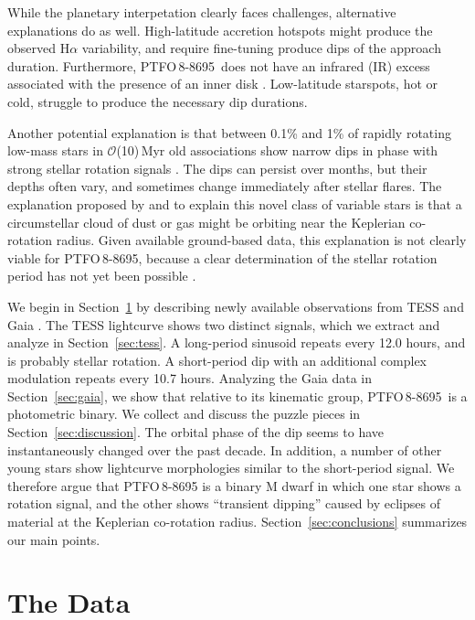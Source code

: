 \documentclass[12pt,twocolumn,tighten]{aastex62}
\newcommand{\ptfo}{PTFO$\,$8-8695}
\begin{document}
While the planetary interpetation clearly faces challenges,
alternative explanations do as well.  High-latitude accretion hotspots
might produce the observed H$\alpha$ variability, and require
fine-tuning produce dips of the approach duration. Furthermore, \ptfo\
does not have an infrared (IR) excess associated with the presence of
an inner disk \citep[{\it e.g.},][Figure~18]{yu_tests_2015}.
Low-latitude starspots, hot or cold, struggle to produce the necessary
dip durations.

Another potential explanation is that between 0.1\% and 1\% of rapidly
rotating low-mass stars in $\mathcal{O}$(10)$\,$Myr old associations
show narrow dips in phase with strong stellar rotation signals
\citep{rebull_usco_2018}.  The dips can persist over months, but their
depths often vary, and sometimes change immediately after stellar
flares.  The explanation proposed by \citet{stauffer_orbiting_2017}
and \citet{david_transient_2017} to explain this novel class of
variable stars is that a circumstellar cloud of dust or gas might be
orbiting near the Keplerian co-rotation radius.  Given available
ground-based data, this explanation is not clearly viable for \ptfo,
because a clear determination of the stellar rotation period has not
yet been possible
\citep{van_eyken_ptf_2012,koen_multicolour_2015,raetz_yeti_2016}.

We begin in Section~\ref{sec:observations} by describing newly
available observations from TESS \citep{ricker_transiting_2015} and
Gaia \citep{gaia_collaboration_gaia_2018}.  The TESS lightcurve shows
two distinct signals, which we extract and analyze in
Section~\ref{sec:tess}.  A long-period sinusoid repeats every 12.0
hours, and is probably stellar rotation.  A short-period dip with an
additional complex modulation repeats every 10.7 hours.  Analyzing the
Gaia data in Section~\ref{sec:gaia}, we show that relative to its
kinematic group, \ptfo\ is a photometric binary.  We collect and
discuss the puzzle pieces in Section~\ref{sec:discussion}.  The
orbital phase of the dip seems to have instantaneously changed over
the past decade.  In addition, a number of other young stars show
lightcurve morphologies similar to the short-period signal.  We
therefore argue that PTFO$\,$8-8695 is a binary M dwarf in which one
star shows a rotation signal, and the other shows ``transient
dipping'' caused by eclipses of material at the Keplerian co-rotation
radius.  Section~\ref{sec:conclusions} summarizes our main points.


\section{The Data}
\label{sec:observations}
\end{document}
